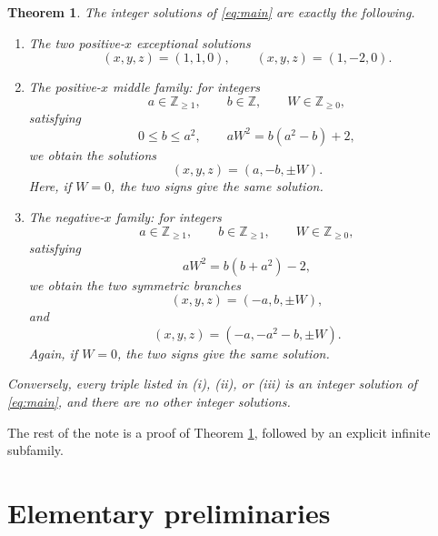 \documentclass[11pt]{article}
\newtheorem{theorem}{Theorem}[section]
\theoremstyle{remark}
\newcommand{\Z}{\mathbb Z}
\newcommand{\Zge}{\mathbb Z_{\ge 0}}
\newcommand{\Zpos}{\mathbb Z_{\ge 1}}
\begin{document}
\begin{theorem}\label{thm:classification}
The integer solutions of \eqref{eq:main} are exactly the following.

\begin{enumerate}[label=\textnormal{(\roman*)},leftmargin=2.1em]
\item The two positive-$x$ exceptional solutions
\[
        (x,y,z)=(1,1,0),\qquad (x,y,z)=(1,-2,0).
\]

\item The positive-$x$ middle family: for integers
\[
        a\in\Zpos,
        \qquad b\in\Z,
        \qquad W\in\Zge,
\]
satisfying
\begin{equation}\label{eq:positive-family-condition}
        0\le b\le a^2,
        \qquad
        aW^2=b(a^2-b)+2,
\end{equation}
we obtain the solutions
\begin{equation}\label{eq:positive-family}
        (x,y,z)=(a,-b,\pm W).
\end{equation}
Here, if $W=0$, the two signs give the same solution.

\item The negative-$x$ family: for integers
\[
        a\in\Zpos,
        \qquad b\in\Zpos,
        \qquad W\in\Zge,
\]
satisfying
\begin{equation}\label{eq:negative-family-condition}
        aW^2=b(b+a^2)-2,
\end{equation}
we obtain the two symmetric branches
\begin{equation}\label{eq:negative-family-positive-branch}
        (x,y,z)=(-a,b,\pm W),
\end{equation}
and
\begin{equation}\label{eq:negative-family-negative-branch}
        (x,y,z)=(-a,-a^2-b,\pm W).
\end{equation}
Again, if $W=0$, the two signs give the same solution.
\end{enumerate}

Conversely, every triple listed in \textnormal{(i)}, \textnormal{(ii)}, or \textnormal{(iii)} is an integer solution of \eqref{eq:main}, and there are no other integer solutions.
\end{theorem}

The rest of the note is a proof of Theorem \ref{thm:classification}, followed by an explicit infinite subfamily.

\section{Elementary preliminaries}
\end{document}

